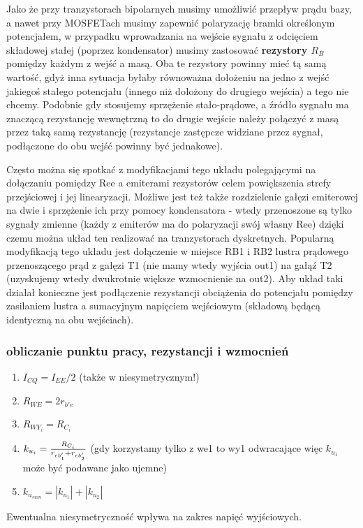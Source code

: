 \documentclass{pdfBooklets}
\begin{document}
Jako że przy tranzystorach bipolarnych musimy umożliwić przepływ prądu bazy, a nawet przy MOSFETach musimy zapewnić polaryzację bramki określonym potencjałem, w przypadku wprowadzania na wejście sygnału z odcięciem składowej stałej (poprzez kondensator) musimy zastosować {\bf rezystory $R_B$} pomiędzy każdym z wejść a masą.
Oba te rezystory powinny mieć tą samą wartość, gdyż inna sytuacja byłaby równoważna dołożeniu na jedno z wejść jakiegoś stałego potencjału (innego niż dołożony do drugiego wejścia) a tego nie chcemy.
Podobnie gdy stosujemy sprzężenie stało-prądowe, a źródło sygnału ma znaczącą rezystancję wewnętrzną to do drugie wejście należy połączyć z masą przez taką samą rezystancję (rezystancje zastępcze widziane przez sygnał, podłączone do obu wejść powinny być jednakowe).

Często można się spotkać z modyfikacjami tego układu polegającymi na dołączaniu pomiędzy Ree a emiterami rezystorów celem powiększenia strefy przejściowej i jej linearyzacji.
Możliwe jest też także rozdzielenie gałęzi emiterowej na dwie i sprzężenie ich przy pomocy kondensatora - wtedy przenoszone są tylko sygnały zmienne (każdy z emiterów ma do polaryzacji swój własny Ree) dzięki czemu można układ ten realizować na tranzystorach dyskretnych.
Popularną modyfikacją tego układu jest dołączenie w miejsce RB1 i RB2 lustra prądowego przenoszącego prąd z gałęzi T1 (nie mamy wtedy wyjścia out1) na gałąź T2 (uzyskujemy wtedy dwukrotnie większe wzmocnienie na out2). Aby układ taki działał konieczne jest podłączenie rezystancji obciążenia do potencjału pomiędzy zasilaniem lustra a sumacyjnym napięciem wejściowym (składową będącą identyczną na obu wejściach).

\subsubsection{obliczanie punktu pracy, rezystancji i wzmocnień}
\begin{enumerate}
	\item $I_{CQ} = I_{EE}/2$ (także w niesymetrycznym!)
	\item $R_{WE} = 2 r_{b'e}$
	\item $R_{WY_i} = R_{C_i}$
	\item $k_{u_i} = {R_{C_i} \over r_{eb'_1} + r_{eb'_2}}$ (gdy korzystamy tylko z we1 to wy1 odwracające więc $k_{u_1}$ może być podawane jako ujemne)
	\item $k_{u_{sum}} = |k_{u_1}| +| k_{u_2}|$
\end{enumerate}
Ewentualna niesymetryczność wpływa na zakres napięć wyjściowych.
\end{document}

